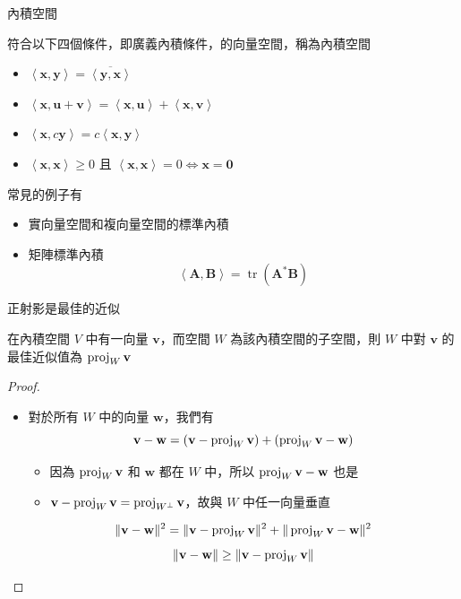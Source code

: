 \documentclass{beamer}
\begin{document}
\begin{CJK}{UTF8}{bsmi}
\begin{frame}{內積空間}
  \begin{definition}
    符合以下四個條件，即廣義內積條件，的向量空間，稱為內積空間
    \begin{itemize}
      \item $\displaystyle \left< \mathbf x, \mathbf y \right> = \overline{\left< \mathbf y, \mathbf x \right>}$
      \item $\displaystyle \left< \mathbf x, \mathbf u + \mathbf v \right>
	  = \left< \mathbf x, \mathbf u \right> + \left< \mathbf x, \mathbf v \right>$
      \item $\displaystyle \left< \mathbf x, c \mathbf y \right> = c \left< \mathbf x, \mathbf y \right>$
      \item $\displaystyle \left< \mathbf x, \mathbf x \right> \ge 0$ 且 $\displaystyle \left< \mathbf x, \mathbf x \right> = 0
	  \Leftrightarrow \mathbf x = \mathbf 0$
    \end{itemize}
  \end{definition}
  常見的例子有
  \begin{itemize}
    \item 實向量空間和複向量空間的標準內積
    \item 矩陣標準內積
      \[\left< \mathbf A, \mathbf B \right> = \operatorname{tr}(\mathbf A^* \mathbf B)\]
  \end{itemize}
\end{frame}

\begin{frame}{正射影是最佳的近似}
  \begin{theorem}
    在內積空間 $V$ 中有一向量 $\mathbf v$，而空間 $W$ 為該內積空間的子空間，則 $W$ 中對 $\mathbf v$ 的最佳近似值為
    $\operatorname{proj}_W \mathbf v$
  \end{theorem}
  \begin{proof}
    \begin{itemize}
    \item 對於所有 $W$ 中的向量 $\mathbf w$，我們有
      \[\mathbf v - \mathbf w = \left( \mathbf v - \operatorname{proj}_W \mathbf v \right) + \left( \operatorname{proj}_W \mathbf v - \mathbf w \right)\]
      \begin{itemize}
	\item 因為 $\operatorname{proj}_W \mathbf v$ 和 $\mathbf w$ 都在 $W$ 中，所以 $\operatorname{proj}_W \mathbf v - \mathbf w$ 也是
	\item $\mathbf v - \operatorname{proj}_W \mathbf v = \operatorname{proj}_{W^\bot} \mathbf v$，故與 $W$ 中任一向量垂直
      \end{itemize}
    \[\Vert \mathbf v - \mathbf w \Vert^2 = \Vert \mathbf v - \operatorname{proj}_W \mathbf v \Vert^2
	+ \Vert \operatorname{proj}_W \mathbf v  - \mathbf w \Vert^2\]
    \[\Vert \mathbf v - \mathbf w \Vert \ge \Vert \mathbf v - \operatorname{proj}_W \mathbf v \Vert\]
    \end{itemize}
  \end{proof}
\end{frame}


\end{CJK}
\end{document}
